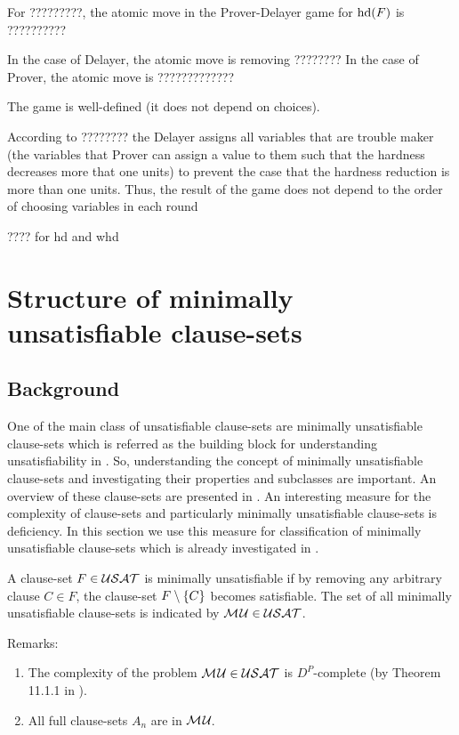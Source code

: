 \documentclass{report}
\begin{document}
\begin{defi}\label{def:atomicmovegraph}
For ?????????, the atomic move in the Prover-Delayer game for $\operatorname{hd}(F)$ is ??????????

In the case of Delayer, the atomic move is removing ????????
In the case of Prover, the atomic move is ?????????????
\end{defi}

\begin{lem}\label{lem:Tseitingame1}
The game is well-defined (it does not depend on choices). 
\end{lem}
\begin{prf}
According to ???????? the Delayer assigns all variables that are trouble maker (the variables that Prover can assign a value to them such that the hardness decreases more that one units) to prevent the case that the hardness reduction is more than one units. Thus, the result of the game does not depend to the order of choosing variables in each round
\end{prf}

\begin{quest}\label{que:game}
???? for hd and whd
\end{quest}
\chapter{Structure of minimally unsatisfiable clause-sets}
\label{cha:mucls}

\section{Background}
\label{sec:basicdef}

One of the main class of unsatisfiable clause-sets are minimally unsatisfiable clause-sets which is referred as the building block for understanding unsatisfiability in \cite{h9}. So, understanding the concept of minimally unsatisfiable clause-sets and investigating their properties and subclasses are important. An overview of these clause-sets are presented in \cite{h9, h25,h29}. An interesting measure for the complexity of clause-sets and particularly minimally unsatisfiable clause-sets is deficiency. In this section we use this measure for classification of minimally unsatisfiable clause-sets which is already investigated in \cite{h9, h25,h26,h24, h27}.

\begin{defi}\label{def:mu}
A clause-set $F \in \mathcal{USAT}$ is minimally unsatisfiable if by removing any arbitrary clause $C \in F$, the clause-set $F \setminus \{ C \}$ becomes satisfiable. The set of all minimally unsatisfiable clause-sets is indicated by $\mathcal{M\hspace{0.8pt}U} \in \mathcal{USAT}$.
\end{defi}
Remarks:
  \begin{enumerate}
  \item The complexity of the problem $\mathcal{M\hspace{0.8pt}U} \in \mathcal{USAT}$ is $D^P$-complete (by Theorem 11.1.1 in \cite{h25}).
  \item All full clause-sets $ A_n$ are in $\mathcal{M\hspace{0.8pt}U}_{\!}$.
  \end{enumerate}
\end{document}
